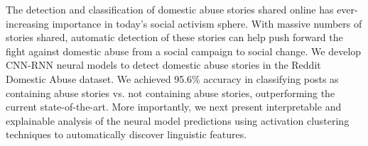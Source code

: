 The detection and classification of domestic abuse stories shared online has ever-increasing importance in today's social activism sphere. With massive numbers of stories shared, automatic detection of these stories can help push forward the fight against domestic abuse from a social campaign to social change. We develop CNN-RNN neural models to detect domestic abuse stories in the Reddit Domestic Abuse dataset. We achieved 95.6\% accuracy in classifying posts as containing abuse stories vs. not containing abuse stories, outperforming the current state-of-the-art. More importantly, we next present interpretable and explainable analysis of the neural model predictions using activation clustering techniques to automatically discover linguistic features.
